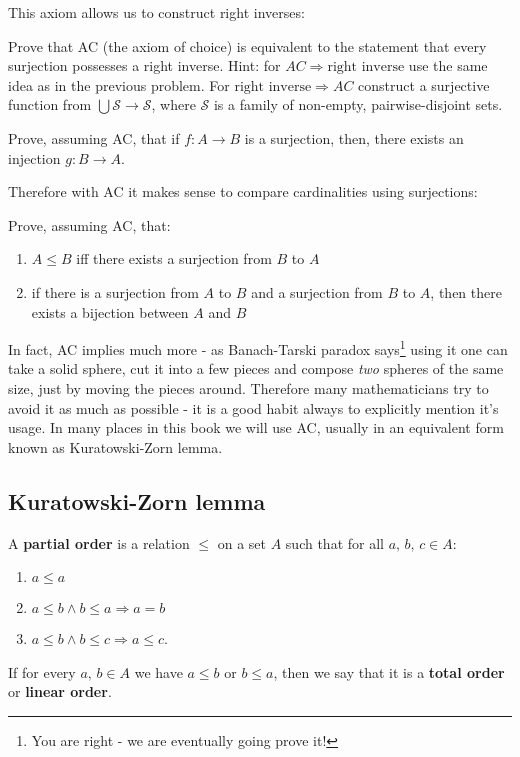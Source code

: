 This axiom allows us to construct right inverses:

\begin{exercise}
  Prove that AC (the axiom of choice) is equivalent to the statement that every surjection possesses a right inverse. Hint: for $AC\Rightarrow \text{right inverse}$ use the same idea as in the previous problem. For
  $\text{right inverse}\Rightarrow AC$ construct a surjective function from $\bigcup \mathcal S\to \mathcal S$, where $\mathcal S$ is a family of non-empty, pairwise-disjoint sets.
\end{exercise}

\begin{exercise}
  Prove, assuming AC, that if $f:A\to B$ is a surjection, then, there exists an injection $g: B\to A$.
\end{exercise}

Therefore with AC it makes sense to compare cardinalities using surjections:

\begin{exercise}
  Prove, assuming AC, that:
  \begin{enumerate}
    \item $A\le B$ iff there exists a surjection from $B$ to $A$
    \item if there is a surjection from $A$ to $B$ and a surjection from $B$ to $A$, then there exists a bijection between $A$ and $B$
  \end{enumerate}
\end{exercise}

In fact, AC implies much more - as Banach-Tarski paradox says\footnote{You are right - we are eventually going prove it!} using it one can take a solid sphere, cut it into a few pieces and compose \emph{two} spheres of the same size, just by moving the pieces around. Therefore many mathematicians try to avoid it as much as possible - it is a good habit always to explicitly mention it's usage. In many places in this book we will use AC, usually in an equivalent form known as Kuratowski-Zorn lemma.

\subsection{Kuratowski-Zorn lemma}

\begin{definition}
  A \textbf{partial order} is a relation $\le$ on a set $A$ such that for all $a,\,b,\,c\in A$:
  \begin{enumerate}
    \item $a\le a$
    \item $a\le b \wedge b\le a\Rightarrow a=b$
    \item $a\le b\wedge b\le c\Rightarrow a\le c$.
  \end{enumerate}
  If for every $a,\,b\in A$ we have $a\le b$ or $b\le a$, then we say that it is a \textbf{total order} or \textbf{linear order}.
\end{definition}

